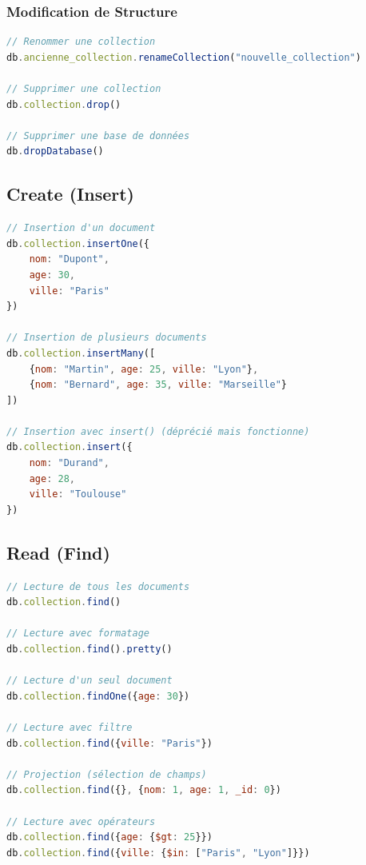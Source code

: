 \documentclass[11pt,a4paper]{article}
\begin{document}
\subsubsection{Modification de Structure}

\begin{lstlisting}[language=JavaScript]
// Renommer une collection
db.ancienne_collection.renameCollection("nouvelle_collection")

// Supprimer une collection
db.collection.drop()

// Supprimer une base de données
db.dropDatabase()
\end{lstlisting}

\subsection{Create (Insert)}

\begin{lstlisting}[language=JavaScript]
// Insertion d'un document
db.collection.insertOne({
    nom: "Dupont",
    age: 30,
    ville: "Paris"
})

// Insertion de plusieurs documents
db.collection.insertMany([
    {nom: "Martin", age: 25, ville: "Lyon"},
    {nom: "Bernard", age: 35, ville: "Marseille"}
])

// Insertion avec insert() (déprécié mais fonctionne)
db.collection.insert({
    nom: "Durand",
    age: 28,
    ville: "Toulouse"
})
\end{lstlisting}

\subsection{Read (Find)}

\begin{lstlisting}[language=JavaScript]
// Lecture de tous les documents
db.collection.find()

// Lecture avec formatage
db.collection.find().pretty()

// Lecture d'un seul document
db.collection.findOne({age: 30})

// Lecture avec filtre
db.collection.find({ville: "Paris"})

// Projection (sélection de champs)
db.collection.find({}, {nom: 1, age: 1, _id: 0})

// Lecture avec opérateurs
db.collection.find({age: {$gt: 25}})
db.collection.find({ville: {$in: ["Paris", "Lyon"]}})
\end{lstlisting}
\end{document}
